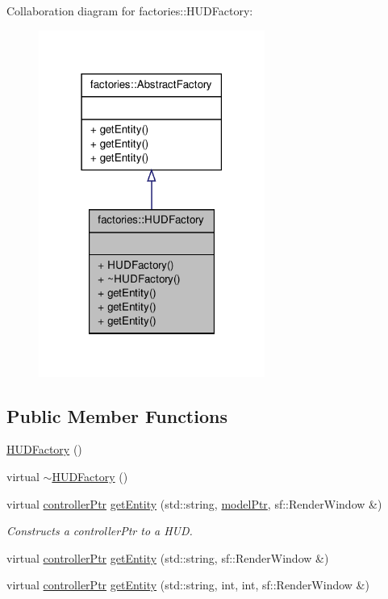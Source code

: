 \-Collaboration diagram for factories\-:\-:\-H\-U\-D\-Factory\-:
\nopagebreak
\begin{figure}[H]
\begin{center}
\leavevmode
\includegraphics[width=210pt]{dd/db6/classfactories_1_1HUDFactory__coll__graph}
\end{center}
\end{figure}
\subsection*{\-Public \-Member \-Functions}
\begin{DoxyCompactItemize}
\item 
\hyperlink{classfactories_1_1HUDFactory_ad7a49569458558b586c07da27276b325}{\-H\-U\-D\-Factory} ()
\item 
virtual \hyperlink{classfactories_1_1HUDFactory_a4475f46b84cec4cfa035dfe25c827f1a}{$\sim$\-H\-U\-D\-Factory} ()
\item 
virtual \hyperlink{Game_8h_a21b04f6cf2d5990b82725fac5ea2ce9a}{controller\-Ptr} \hyperlink{classfactories_1_1HUDFactory_a1e6ed81c506d5c249ccd368df8bceccb}{get\-Entity} (std\-::string, \hyperlink{ModelView_8h_a78966ddb517fca8d2b29a2bc5c31e74e}{model\-Ptr}, sf\-::\-Render\-Window \&)
\begin{DoxyCompactList}\small\item\em \-Constructs a controller\-Ptr to a \-H\-U\-D. \end{DoxyCompactList}\item 
virtual \hyperlink{Game_8h_a21b04f6cf2d5990b82725fac5ea2ce9a}{controller\-Ptr} \hyperlink{classfactories_1_1HUDFactory_ae5675b73f28d2477442c86af51dce2c2}{get\-Entity} (std\-::string, sf\-::\-Render\-Window \&)
\item 
virtual \hyperlink{Game_8h_a21b04f6cf2d5990b82725fac5ea2ce9a}{controller\-Ptr} \hyperlink{classfactories_1_1HUDFactory_a991c959cad9bc072b9785da1db3b2e3b}{get\-Entity} (std\-::string, int, int, sf\-::\-Render\-Window \&)
\end{DoxyCompactItemize}


